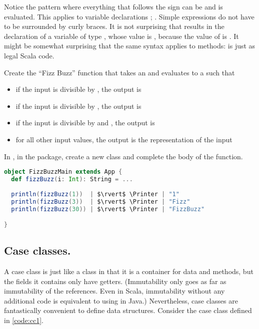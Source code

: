 \documentclass[10 pt]{article}
\begin{document}
Notice the pattern where everything that follows the \pcode{=} sign can be and is evaluated. This applies to variable declarations ; . Simple expressions do not have to be surrounded by curly braces. It is not surprising that  results in the declaration of a variable  of type , whose value is , because the value of  is . It might be somewhat surprising that the same syntax applies to methods:  is just as legal Scala code.

\begin{example}
Create the ``Fizz Buzz'' function that takes an  and evaluates to a  such that 
\begin{itemize}
  \item if the input is divisible by , the output is 
  \item if the input is divisible by , the output is 
  \item if the input is divisible by  and , the output is 
  \item for all other input values, the output is the  representation of the input
\end{itemize}

In , in the  package, create a new class  and complete the body of the  function.

\begin{lstlisting}[caption={Fizz Buzz}, label={code:fb}, language=Scala, escapechar=|]
object FizzBuzzMain extends App {
  def fizzBuzz(i: Int): String = ...
  
  println(fizzBuzz(1))  | $\rvert$ \Printer | "1"
  println(fizzBuzz(3))  | $\rvert$ \Printer | "Fizz"
  println(fizzBuzz(30)) | $\rvert$ \Printer | "FizzBuzz"

}
\end{lstlisting}
\end{example}

\subsection{Case classes.} A case class is just like a class in that it is a container for data and methods, but the fields it contains only have getters. (Immutability only goes as far as immutability of the references. Even in Scala, immutability without any additional code is equivalent to using  in Java.) Nevertheless, case classes are fantastically convenient to define data structures. Consider the  case class defined in \autoref{code:cc1}.
\end{document}
